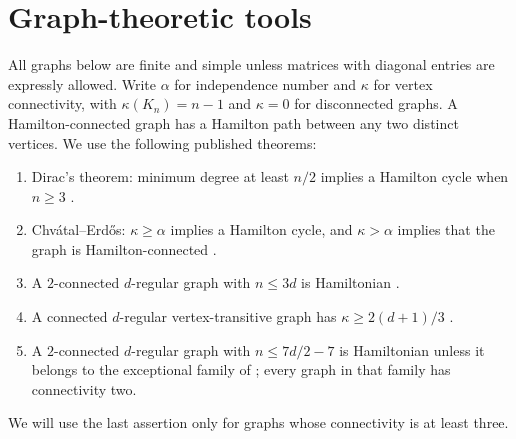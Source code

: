 \documentclass[11pt]{article}
\theoremstyle{definition}
\begin{document}
\section{Graph-theoretic tools}\label{sec:graphs}
All graphs below are finite and simple unless matrices with diagonal entries are expressly allowed. Write $\alpha$ for independence number and $\kappa$ for vertex connectivity, with $\kappa(K_n)=n-1$ and $\kappa=0$ for disconnected graphs. A Hamilton-connected graph has a Hamilton path between any two distinct vertices.
We use the following published theorems:
\begin{enumerate}
\item Dirac's theorem: minimum degree at least $n/2$ implies a Hamilton cycle when $n\ge3$ \cite{Dirac}.
\item Chv\'atal--Erd\H{o}s: $\kappa\ge\alpha$ implies a Hamilton cycle, and $\kappa>\alpha$ implies that the graph is Hamilton-connected \cite[Theorems 1 and 3]{CE}.
\item A $2$-connected $d$-regular graph with $n\le3d$ is Hamiltonian \cite{Jackson}.
\item A connected $d$-regular vertex-transitive graph has $\kappa\ge2(d+1)/3$ \cite{Watkins}.
\item A $2$-connected $d$-regular graph with $n\le7d/2-7$ is Hamiltonian unless it belongs to the exceptional family of \cite{BHVJ}; every graph in that family has connectivity two.
\end{enumerate}
We will use the last assertion only for graphs whose connectivity is at least three.
\end{document}
